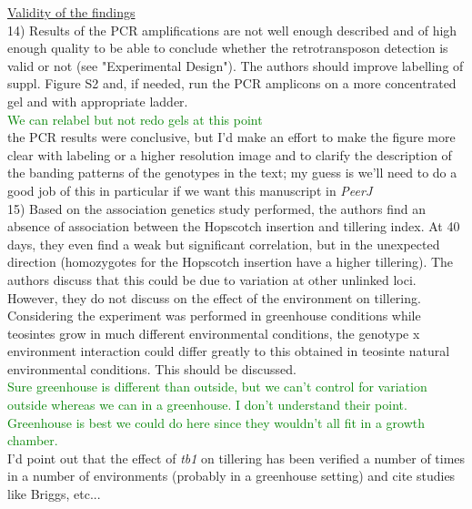 \documentclass[11pt]{article}
\newcommand{\lev}[1]{\noindent \textcolor{green}{{#1}} \\}
\newcommand{\mbh}[1]{\noindent \textcolor{Dandelion}{{#1}}\\}
\begin{document}
\underline{Validity of the findings}\\

14) Results of the PCR amplifications are not well enough described and of high enough quality to be able to conclude whether the retrotransposon detection is valid or not (see "Experimental Design"). The authors should improve labelling of suppl. Figure S2 and, if needed, run the PCR amplicons on a more concentrated gel and with appropriate ladder.\\

\lev{We can relabel but not redo gels at this point}
\mbh{the PCR results were conclusive, but I'd make an effort to make the figure more clear with labeling or a higher resolution image and to clarify the description of the banding patterns of the genotypes in the text; my guess is we'll need to do a good job of this in particular if we want this manuscript in \emph{PeerJ}}  

15) Based on the association genetics study performed, the authors find an absence of association between the Hopscotch insertion and tillering index. At 40 days, they even find a weak but significant correlation, but in the unexpected direction (homozygotes for the Hopscotch insertion have a higher tillering). The authors discuss that this could be due to variation at other unlinked loci. However, they do not discuss on the effect of the environment on tillering. Considering the experiment was performed in greenhouse conditions while teosintes grow in much different environmental conditions, the genotype x environment interaction could differ greatly to this obtained in teosinte natural environmental conditions. This should be discussed.\\

\lev{Sure greenhouse is different than outside, but we can't control for variation outside whereas we can in a greenhouse. I don't understand their point. Greenhouse is best we could do here since they wouldn't all fit in a growth chamber.}

\mbh{I'd point out that the effect of \emph{tb1} on tillering has been verified a number of times in a number of environments (probably in a greenhouse setting) and cite studies like Briggs, etc...}


\end{document}

